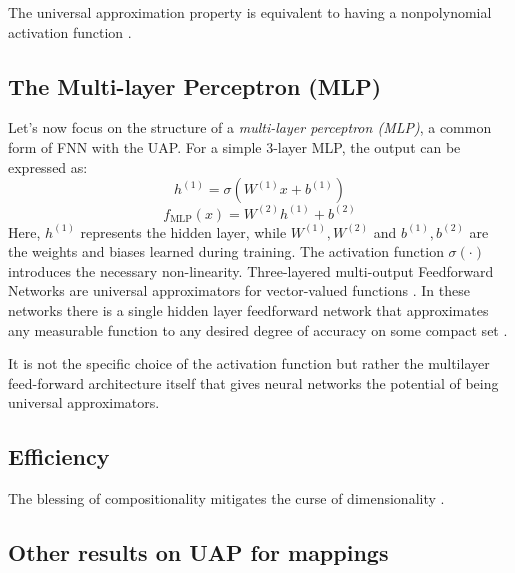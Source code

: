 \documentclass{article}
\theoremstyle{definition} \newtheorem{definition}{Definition}
\theoremstyle{remark} \newtheorem{remark}{Remark}
\newcounter{ct}
\begin{document}
The universal approximation property is equivalent to having a nonpolynomial activation function \citep{pinkus1999approximation}.


\subsection{The Multi-layer Perceptron (MLP)}
Let’s now focus on the structure of a \textit{multi-layer perceptron (MLP)}, a common form of FNN with the UAP.
 For a simple 3-layer MLP, the output can be expressed as:
\[
h^{(1)} = \sigma(W^{(1)} x + b^{(1)})
\]
\[
f_{\text{MLP}}(x) = W^{(2)} h^{(1)} + b^{(2)}
\]
Here, \(h^{(1)}\) represents the hidden layer, while \(W^{(1)}, W^{(2)}\) and \(b^{(1)}, b^{(2)}\) are the weights and biases learned during training. The activation function \(\sigma(\cdot)\) introduces the necessary non-linearity.
Three-layered multi-output Feedforward Networks are universal approximators for vector-valued functions \citep{irie1988capabilities}.
In these networks there is a single hidden layer feedforward network that approximates any measurable function to any desired degree of accuracy on some compact set \citep{hornik1989multilayer}.

It is not the specific choice of the activation function but rather the multilayer feed-forward architecture itself that gives neural networks the potential of being universal approximators\citep{hornik1991approximation}.





\subsection{Efficiency}
The blessing of compositionality mitigates the curse of dimensionality \citep{mhaskar2019function}.


\subsection{Other results on UAP for mappings}
\end{document}
